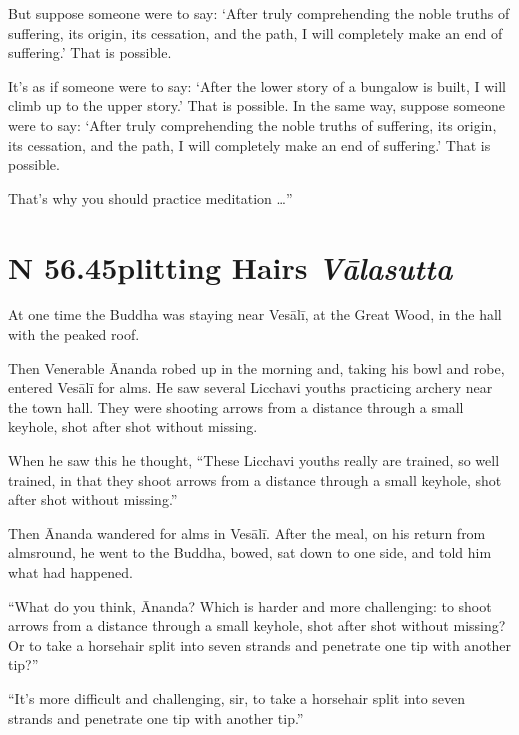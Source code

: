 \documentclass[12pt,openany]{book}%
\newcommand*{\suttatitleacronym}[1]{\smaller[2]{#1}\vspace*{.3em}}
\newcommand*{\suttatitletranslation}[1]{\linebreak{#1}}
\newcommand*{\suttatitleroot}[1]{\linebreak\smaller[2]\itshape{#1}}
\newcommand*{\tocacronym}[1]{\hspace*{-3.3em}{#1}\quad}
\newcommand*{\toctranslation}[1]{#1}
\newcommand*{\tocroot}[1]{(\textit{#1})}
\begin{document}
But suppose someone were to say: ‘After truly comprehending the noble truths of suffering, its origin, its cessation, and the path, I will completely make an end of suffering.’ That is possible. 

It’s as if someone were to say: ‘After the lower story of a bungalow is built, I will climb up to the upper story.’ That is possible. In the same way, suppose someone were to say: ‘After truly comprehending the noble truths of suffering, its origin, its cessation, and the path, I will completely make an end of suffering.’ That is possible. 

That’s why you should practice meditation …” 

%
\section*{{\suttatitleacronym SN 56.45}{\suttatitletranslation Splitting Hairs }{\suttatitleroot Vālasutta}}
\addcontentsline{toc}{section}{\tocacronym{SN 56.45} \toctranslation{Splitting Hairs } \tocroot{Vālasutta}}

At one time the Buddha was staying near \textsanskrit{Vesālī}, at the Great Wood, in the hall with the peaked roof. 

Then Venerable Ānanda robed up in the morning and, taking his bowl and robe, entered \textsanskrit{Vesālī} for alms. He saw several Licchavi youths practicing archery near the town hall. They were shooting arrows from a distance through a small keyhole, shot after shot without missing. 

When he saw this he thought, “These Licchavi youths really are trained, so well trained, in that they shoot arrows from a distance through a small keyhole, shot after shot without missing.” 

Then Ānanda wandered for alms in \textsanskrit{Vesālī}. After the meal, on his return from almsround, he went to the Buddha, bowed, sat down to one side, and told him what had happened. 

“What do you think, Ānanda? Which is harder and more challenging: to shoot arrows from a distance through a small keyhole, shot after shot without missing? Or to take a horsehair split into seven strands and penetrate one tip with another tip?” 

“It’s more difficult and challenging, sir, to take a horsehair split into seven strands and penetrate one tip with another tip.” 
\end{document}
